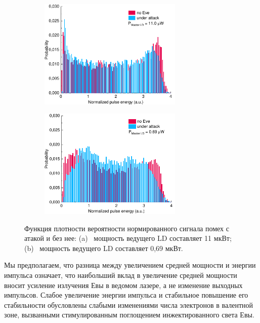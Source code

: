\begin{figure}
\begin{subfigure}%
	\centering
	\includegraphics[width=0.75\textwidth]{images/hist_attack_11.pdf}
	\caption{}
\end{subfigure}
\hfill
\begin{subfigure}%
	\centering
	\includegraphics[width=0.75\textwidth]{images/hist_attack_01.pdf}
	\caption{}
\end{subfigure}
\caption{Функция плотности вероятности нормированного сигнала помех с атакой и без нее: (a)~ мощность ведущего LD составляет 11 мкВт; (b)~ мощность ведущего LD составляет 0,69 мкВт.}
\label{fig:histogram}
\end{figure}
Мы предполагаем, что разница между увеличением средней мощности и энергии импульса означает, что наибольший вклад в увеличение средней мощности вносит усиление излучения Евы в ведомом лазере, а не изменение выходных импульсов. Слабое увеличение энергии импульса и стабильное повышение его стабильности обусловлены слабыми изменениями числа электронов в валентной зоне, вызванными стимулированным поглощением инжектированного света Евы. 

